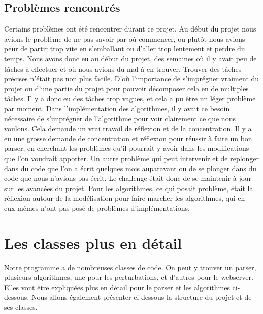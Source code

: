 \documentclass[french, 12pt]{article}
\begin{document}
\subsection{Problèmes rencontrés}
Certains problèmes ont été rencontrer durant ce projet.
Au début du projet nous avions le problème de ne pas savoir par où commencer, ou plutôt nous avions peur de partir trop vite en s'emballant ou d'aller trop lentement et perdre du temps. Nous avons donc eu au début du projet, des semaines où il y avait peu de tâches à effectuer et où nous avions du mal à en trouver. Trouver des tâches précises n'était pas non plus facile.
D'où l'importance de s'imprégner vraiment du projet ou d'une partie du projet pour pouvoir décomposer cela en de multiples tâches. Il y a donc eu des tâches trop vagues, et cela a pu être un léger problème par moment. Dans l'implémentation des algorithmes, il y avait ce besoin nécessaire de s'imprégner de l'algorithme pour voir clairement ce que nous voulons. Cela demande un vrai travail de réflexion et de la concentration. Il y a eu une grosse demande de concentration et réflexion pour réussir à faire un bon parser, en cherchant les problèmes qu'il pourrait y avoir dans les modifications que l'on voudrait apporter.
Un autre problème qui peut intervenir et de replonger dans du code que l'on a écrit quelques mois auparavant ou de se plonger dans du code que nous n'avions pas écrit. Le challenge était donc de se maintenir à jour sur les avancées du projet.
Pour les algorithmes, ce qui posait problème, était la réflexion autour de la modélisation pour faire marcher les algorithmes, qui en eux-mêmes n'ont pas posé de problèmes d'implémentations.



\newpage
\section{Les classes plus en détail}
Notre programme a de nombreuses classes de code. On peut y trouver un parser, plusieurs algorithmes, une pour les perturbations, et d'autres pour le webserver. Elles vont être expliquées plus en détail pour le parser et les algorithmes ci-dessous. Nous allons également présenter ci-dessous la structure du projet et de ses classes.
\end{document}
